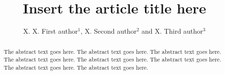 \documentclass[]{rsos}%
\begin{document}
\title{Insert the article title here}

\author{%
X. X. First author$^{1}$, X. Second author$^{2}$ and X. Third author$^{3}$}

\address{$^{1}$First author address\\
$^{2}$Second author address\\
$^{3}$Third author address}

\subject{xxxxx, xxxxx, xxxx}



\begin{abstract}
The abstract text goes here. The abstract text goes here. The abstract text goes here. The abstract text goes here.
The abstract text goes here. The abstract text goes here. The abstract text goes here. The abstract text goes here.
\end{abstract}

\end{document}
